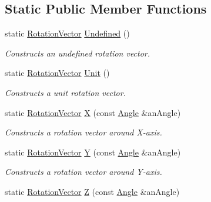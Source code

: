 \subsection*{Static Public Member Functions}
\begin{DoxyCompactItemize}
\item 
static \hyperlink{classostk_1_1math_1_1geom_1_1d3_1_1trf_1_1rot_1_1_rotation_vector}{Rotation\+Vector} \hyperlink{classostk_1_1math_1_1geom_1_1d3_1_1trf_1_1rot_1_1_rotation_vector_ae0817d7a934343653d23c02e8aee9bc0}{Undefined} ()
\begin{DoxyCompactList}\small\item\em Constructs an undefined rotation vector. \end{DoxyCompactList}\item 
static \hyperlink{classostk_1_1math_1_1geom_1_1d3_1_1trf_1_1rot_1_1_rotation_vector}{Rotation\+Vector} \hyperlink{classostk_1_1math_1_1geom_1_1d3_1_1trf_1_1rot_1_1_rotation_vector_a298536fda35c1f579a96dc5eaa003b37}{Unit} ()
\begin{DoxyCompactList}\small\item\em Constructs a unit rotation vector. \end{DoxyCompactList}\item 
static \hyperlink{classostk_1_1math_1_1geom_1_1d3_1_1trf_1_1rot_1_1_rotation_vector}{Rotation\+Vector} \hyperlink{classostk_1_1math_1_1geom_1_1d3_1_1trf_1_1rot_1_1_rotation_vector_af24a0322c5b9c2bbfb745468e97147e9}{X} (const \hyperlink{classostk_1_1math_1_1geom_1_1_angle}{Angle} \&an\+Angle)
\begin{DoxyCompactList}\small\item\em Constructs a rotation vector around X-\/axis. \end{DoxyCompactList}\item 
static \hyperlink{classostk_1_1math_1_1geom_1_1d3_1_1trf_1_1rot_1_1_rotation_vector}{Rotation\+Vector} \hyperlink{classostk_1_1math_1_1geom_1_1d3_1_1trf_1_1rot_1_1_rotation_vector_a2605678dcb011512cb5f8266cfd6eec5}{Y} (const \hyperlink{classostk_1_1math_1_1geom_1_1_angle}{Angle} \&an\+Angle)
\begin{DoxyCompactList}\small\item\em Constructs a rotation vector around Y-\/axis. \end{DoxyCompactList}\item 
static \hyperlink{classostk_1_1math_1_1geom_1_1d3_1_1trf_1_1rot_1_1_rotation_vector}{Rotation\+Vector} \hyperlink{classostk_1_1math_1_1geom_1_1d3_1_1trf_1_1rot_1_1_rotation_vector_a6ffce9680c2947b0da14c7c8e4d6a72b}{Z} (const \hyperlink{classostk_1_1math_1_1geom_1_1_angle}{Angle} \&an\+Angle)

\end{DoxyCompactItemize}
